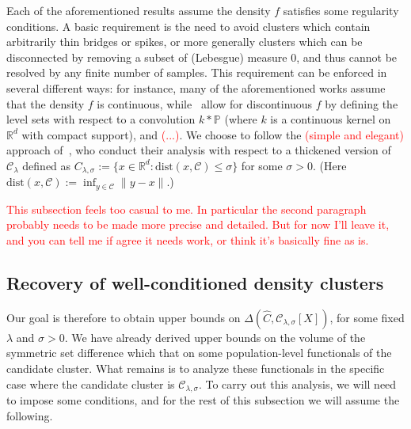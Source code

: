 \documentclass[11pt,twoside]{article}
\newcommand{\Reals}{\mathbb{R}}
\newcommand{\1}{\mathbf{1}}
\newcommand{\Rd}{\Reals^d}
\newcommand{\mc}[1]{\mathcal{#1}}
\newcommand{\wh}[1]{\widehat{#1}}
\newcommand{\dist}{\mathrm{dist}}
\begin{document}
Each of the aforementioned results assume the density $f$ satisfies some regularity conditions. A basic requirement is the need to avoid clusters which contain arbitrarily thin bridges or spikes, or more generally clusters which can be disconnected by removing a subset of (Lebesgue) measure $0$, and thus cannot be resolved by any finite number of samples. This requirement can be enforced in several different ways: for instance, many of the aforementioned works assume that the density $f$ is continuous, while~\cite{rinaldo2010} allow for discontinuous $f$ by defining the level sets with respect to a convolution $k \ast \mathbb{P}$ (where $k$ is a continuous kernel on $\Rd$ with compact support), and \cite{steinwart2015} \textcolor{red}{(...)}. We choose to follow the \textcolor{red}{(simple and elegant)} approach of~\cite{chaudhuri2010}, who conduct their analysis with respect to a thickened version of $\mc{C}_{\lambda}$ defined as $C_{\lambda,\sigma} := \{x \in \Reals^d: \dist(x,\mc{C}) \leq \sigma\}$ for some $\sigma > 0$. (Here $\dist(x,\mc{C}) := \inf_{y \in \mc{C}} \|y - x\|$.)

\textcolor{red}{This subsection feels too casual to me. In particular the second paragraph probably needs to be made more precise and detailed. But for now I'll leave it, and you can tell me if agree it needs work, or think it's basically fine as is.}

\subsection{Recovery of well-conditioned density clusters}
\label{subsec:recovery_well-conditioned_density_clusters}

Our goal is therefore to obtain upper bounds on $\Delta(\wh{C},\mc{C}_{\lambda,\sigma}[X])$, for some fixed $\lambda$ and $\sigma > 0$. We have already derived upper bounds on the volume of the symmetric set difference which that on some population-level functionals of the candidate cluster. What remains is to analyze these functionals in the specific case where the candidate cluster is $\mc{C}_{\lambda,\sigma}$. To carry out this analysis, we will need to impose some conditions, and for the rest of this subsection we will assume the following.
\end{document}
